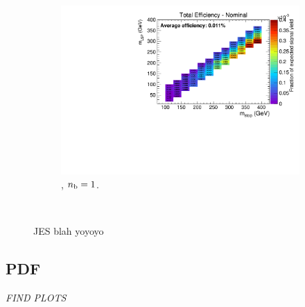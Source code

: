 \begin{figure}[ht!]
\begin{subfigure}[b]{0.32\textwidth}
    \includegraphics[width=\textwidth, page=6]{Figs/sms/t2degen/v5/JES_T2_4body_v5_eq1b_ge4j_incl.pdf}
    \caption{\njhigh, $n_{\text{b}} = 1$.}
    \label{fig:sms-jes-tdegen-ge4j-1b}
  \end{subfigure}\\
  \caption{JES blah yoyoyo}
  \label{fig:sms-jes-t2degen}
\end{figure}


\newpage
\subsection*{PDF}
\label{sec:t2degen_pdf_plots}
\emph{FIND PLOTS}



